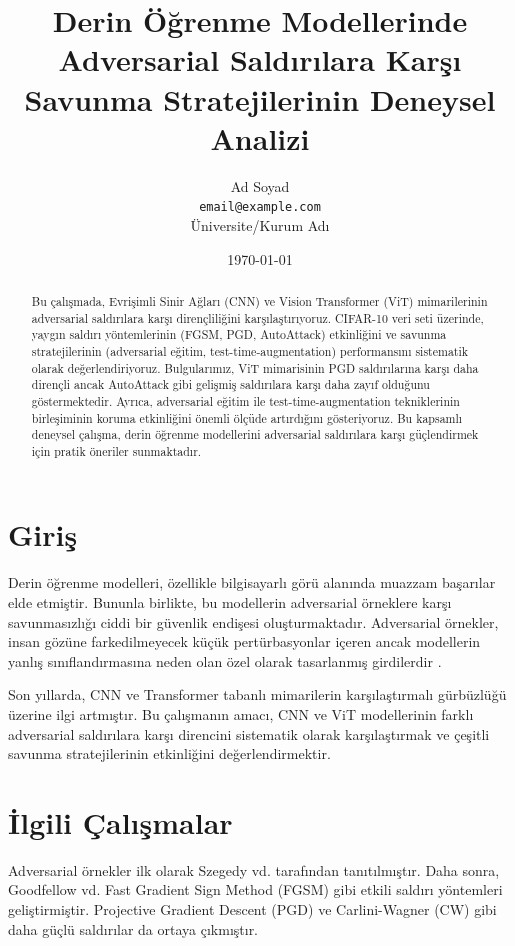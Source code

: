\documentclass[a4paper,12pt]{article}
\title{Derin Öğrenme Modellerinde Adversarial Saldırılara Karşı Savunma Stratejilerinin Deneysel Analizi}
\author{Ad Soyad\\
\texttt{email@example.com}\\
Üniversite/Kurum Adı
}
\date{\today}
\begin{document}
\maketitle

\begin{abstract}
Bu çalışmada, Evrişimli Sinir Ağları (CNN) ve Vision Transformer (ViT) mimarilerinin adversarial saldırılara karşı dirençliliğini karşılaştırıyoruz. CIFAR-10 veri seti üzerinde, yaygın saldırı yöntemlerinin (FGSM, PGD, AutoAttack) etkinliğini ve savunma stratejilerinin (adversarial eğitim, test-time-augmentation) performansını sistematik olarak değerlendiriyoruz. Bulgularımız, ViT mimarisinin PGD saldırılarına karşı daha dirençli ancak AutoAttack gibi gelişmiş saldırılara karşı daha zayıf olduğunu göstermektedir. Ayrıca, adversarial eğitim ile test-time-augmentation tekniklerinin birleşiminin koruma etkinliğini önemli ölçüde artırdığını gösteriyoruz. Bu kapsamlı deneysel çalışma, derin öğrenme modellerini adversarial saldırılara karşı güçlendirmek için pratik öneriler sunmaktadır.
\end{abstract}

\section{Giriş}
Derin öğrenme modelleri, özellikle bilgisayarlı görü alanında muazzam başarılar elde etmiştir. Bununla birlikte, bu modellerin adversarial örneklere karşı savunmasızlığı ciddi bir güvenlik endişesi oluşturmaktadır. Adversarial örnekler, insan gözüne farkedilmeyecek küçük pertürbasyonlar içeren ancak modellerin yanlış sınıflandırmasına neden olan özel olarak tasarlanmış girdilerdir \cite{szegedy2014}.

Son yıllarda, CNN ve Transformer tabanlı mimarilerin karşılaştırmalı gürbüzlüğü üzerine ilgi artmıştır. Bu çalışmanın amacı, CNN ve ViT modellerinin farklı adversarial saldırılara karşı direncini sistematik olarak karşılaştırmak ve çeşitli savunma stratejilerinin etkinliğini değerlendirmektir.

\section{İlgili Çalışmalar}
Adversarial örnekler ilk olarak Szegedy vd. \cite{szegedy2014} tarafından tanıtılmıştır. Daha sonra, Goodfellow vd. \cite{goodfellow2015} Fast Gradient Sign Method (FGSM) gibi etkili saldırı yöntemleri geliştirmiştir. Projective Gradient Descent (PGD) \cite{madry2018} ve Carlini-Wagner (CW) \cite{carlini2017} gibi daha güçlü saldırılar da ortaya çıkmıştır.
\end{document}
